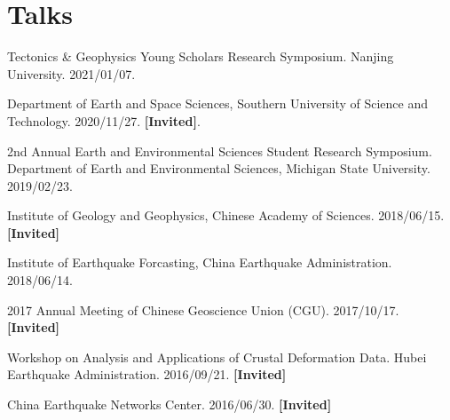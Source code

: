 \section{Talks}

\newcommand{\Invited}{\textbf{[Invited]}}

\begin{etaremune}
\item
	Tectonics \& Geophysics Young Scholars Research Symposium.
	Nanjing University.
	2021/01/07.
\item
	Department of Earth and Space Sciences, Southern University of Science and Technology.
	2020/11/27.
	\Invited.
\item
    2nd Annual Earth and Environmental Sciences Student Research Symposium.
    Department of Earth and Environmental Sciences, Michigan State University.
    2019/02/23.
\item
    Institute of Geology and Geophysics, Chinese Academy of Sciences.
    2018/06/15.
    \Invited
\item
    Institute of Earthquake Forcasting, China Earthquake Administration.
    2018/06/14.
\item
    2017 Annual Meeting of Chinese Geoscience Union (CGU).
    2017/10/17.
    \Invited
\item
    Workshop on Analysis and Applications of Crustal Deformation Data.
    Hubei Earthquake Administration.
    2016/09/21.
    \Invited
\item
    China Earthquake Networks Center.
    2016/06/30.
    \Invited
\end{etaremune}
